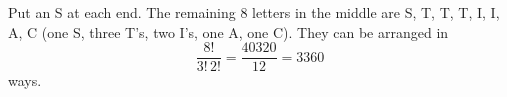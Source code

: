 Put an S at each end. The remaining $8$ letters in the middle are S, T, T, T, I, I, A, C (one S, three T's, two I's, one A, one C). They can be arranged in
\[
\dfrac{8!}{3!\,2!}=\dfrac{40320}{12}=\boxed{3360}
\]
ways.
